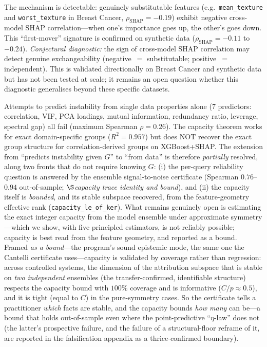 \documentclass[11pt,a4paper]{article}
\begin{document}
The mechanism is detectable: genuinely substitutable features (e.g.\ \texttt{mean\_texture} and \texttt{worst\_texture} in Breast Cancer, $\rho_{\mathrm{SHAP}} = -0.19$) exhibit negative cross-model SHAP correlation---when one's importance goes up, the other's goes down.  This ``first-mover'' signature is confirmed on synthetic data ($\rho_{\mathrm{SHAP}} = -0.11$ to $-0.24$).  \emph{Conjectural diagnostic:} the sign of cross-model SHAP correlation may detect genuine exchangeability (negative~$=$ substitutable; positive~$=$ independent).  This is validated directionally on Breast Cancer and synthetic data but has not been tested at scale; it remains an open question whether this diagnostic generalises beyond these specific datasets.

Attempts to predict instability from single data properties alone (7 predictors: correlation, VIF, PCA loadings, mutual information, redundancy ratio, leverage, spectral gap) all fail (maximum Spearman $\rho = 0.26$).  The capacity theorem works for exact domain-specific groups ($R^2 = 0.957$) but does NOT recover the exact group structure for correlation-derived groups on XGBoost+SHAP.  The extension from ``predicts instability given $G$'' to ``from data'' is therefore \emph{partially} resolved, along two fronts that do not require knowing $G$: (i) the per-query reliability question is answered by the ensemble signal-to-noise certificate (Spearman $0.76$--$0.94$ out-of-sample; $\S$\emph{capacity trace identity and bound}), and (ii) the capacity itself is \emph{bounded}, and its stable subspace recovered, from the feature-geometry effective rank (\texttt{capacity\_le\_of\_ker}). What remains genuinely open is estimating the exact integer capacity from the model ensemble under approximate symmetry---which we show, with five principled estimators, is not reliably possible; capacity is best read from the feature geometry, and reported as a bound.  Framed \emph{as a bound}---the program's sound epistemic mode, the same one the Cantelli certificate uses---capacity is validated by coverage rather than regression: across controlled systems, the dimension of the attribution subspace that is stable on \emph{two independent} ensembles (the transfer-confirmed, identifiable structure) respects the capacity bound with $100\%$ coverage and is informative ($C/p \approx 0.5$), and it is tight (equal to $C$) in the pure-symmetry cases.  So the certificate tells a practitioner \emph{which} facts are stable, and the capacity bounds \emph{how many} can be---a bound that holds out-of-sample even where the point-predictive ``$\eta$-law'' does not (the latter's prospective failure, and the failure of a structural-floor reframe of it, are reported in the falsification appendix as a thrice-confirmed boundary).
\end{document}
